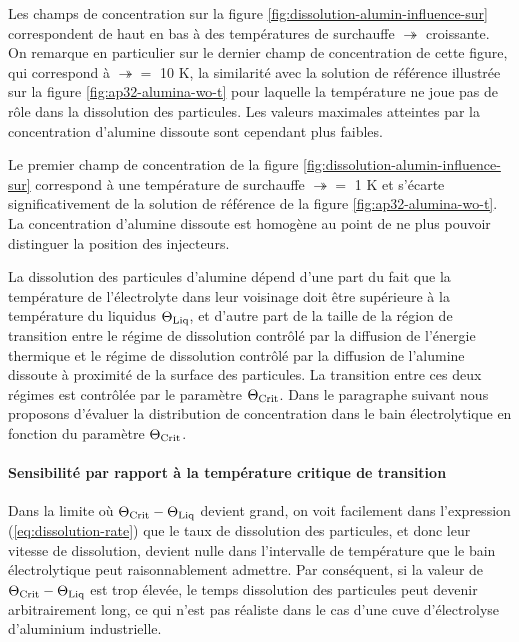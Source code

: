 Les champs de concentration sur la figure
\ref{fig:dissolution-alumin-influence-sur} correspondent de haut en
bas à des températures de surchauffe $\tsur$ croissante. On remarque
en particulier sur le dernier champ de concentration de cette figure,
qui correspond à $\tsur = $ \num{10} \si{\kelvin}, la similarité avec la
solution de référence illustrée sur la figure
\ref{fig:ap32-alumina-wo-t} pour laquelle la température ne joue pas
de rôle dans la dissolution des particules. Les valeurs maximales
atteintes par la concentration d'alumine dissoute sont cependant plus faibles.

Le premier champ de concentration de la figure
\ref{fig:dissolution-alumin-influence-sur} correspond à une
température de surchauffe $\tsur =$ \num{1} \si{\kelvin} et s'écarte
significativement de la solution de référence de la figure
\ref{fig:ap32-alumina-wo-t}. La concentration d'alumine dissoute est
homogène au point de ne plus pouvoir distinguer la position des
injecteurs.

La dissolution des particules d'alumine dépend d'une part du fait que
la température de l'électrolyte dans leur voisinage doit être
supérieure à la température du liquidus $\Theta_\text{Liq}$, et d'autre part de la
taille de la région de transition entre le régime de dissolution
contrôlé par la diffusion de l'énergie thermique et le régime de
dissolution contrôlé par la diffusion de l'alumine dissoute à
proximité de la surface des particules. La transition entre ces deux
régimes est contrôlée par le paramètre $\Theta_\text{Crit}$. Dans le paragraphe
suivant nous proposons d'évaluer la distribution de concentration dans
le bain électrolytique en fonction du paramètre $\Theta_\text{Crit}$.


\clearpage
\paragraph{Sensibilité par rapport à la température critique de transition}


Dans la limite où $\Theta_\text{Crit} - \Theta_\text{Liq}$ devient grand, on voit facilement
dans l'expression (\ref{eq:dissolution-rate}) que le taux de
dissolution des particules, et donc leur vitesse de dissolution,
devient nulle dans l'intervalle de température que le bain
électrolytique peut raisonnablement admettre. Par conséquent, si la
valeur de $\Theta_\text{Crit} - \Theta_\text{Liq}$ est trop élevée, le temps dissolution des
particules peut devenir arbitrairement long, ce qui n'est pas réaliste
dans le cas d'une cuve d'électrolyse d'aluminium industrielle.

